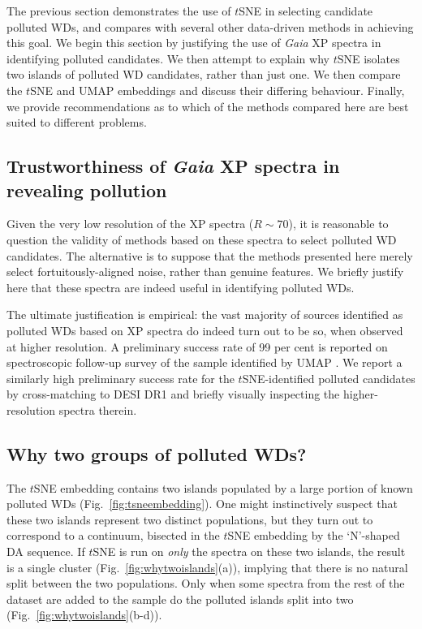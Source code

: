 \documentclass[fleqn,usenatbib]{rasti}
\begin{document}
The previous section demonstrates the use of $t$SNE in selecting candidate polluted WDs, and compares with several other data-driven methods in achieving this goal.
We begin this section by justifying the use of \textit{Gaia} XP spectra in identifying polluted candidates.
We then attempt to explain why $t$SNE isolates two islands of polluted WD candidates, rather than just one.
We then compare the $t$SNE and UMAP embeddings and discuss their differing behaviour.
Finally, we provide recommendations as to which of the methods compared here are best suited to different problems.


\subsection{Trustworthiness of \textit{Gaia} XP spectra in revealing pollution}

Given the very low resolution of the XP spectra ($R\sim 70$), it is reasonable to question the validity of methods based on these spectra to select polluted WD candidates.
The alternative is to suppose that the methods presented here merely select fortuitously-aligned noise, rather than genuine features.
We briefly justify here that these spectra are indeed useful in identifying polluted WDs.

The ultimate justification is empirical: the vast majority of sources identified as polluted WDs based on XP spectra do indeed turn out to be so, when observed at higher resolution.
A preliminary success rate of 99 per cent is reported on spectroscopic follow-up survey of the sample identified by UMAP \citep{kao24}.
We report a similarly high preliminary success rate for the $t$SNE-identified polluted candidates by cross-matching to DESI DR1 \citep{desidr1} and briefly visually inspecting the higher-resolution spectra therein.


\subsection{Why two groups of polluted WDs?}
\label{sec:whytwo}

The $t$SNE embedding contains two islands populated by a large portion of known polluted WDs (Fig.~\ref{fig:tsneembedding}).
One might instinctively suspect that these two islands represent two distinct populations, but they turn out to correspond to a continuum, bisected in the $t$SNE embedding by the `N'-shaped DA sequence.
If $t$SNE is run on \textit{only} the spectra on these two islands, the result is a single cluster (Fig.~\ref{fig:whytwoislands}(a)), implying that there is no natural split between the two populations.
Only when some spectra from the rest of the dataset are added to the sample do the polluted islands split into two (Fig.~\ref{fig:whytwoislands}(b-d)).
\end{document}
